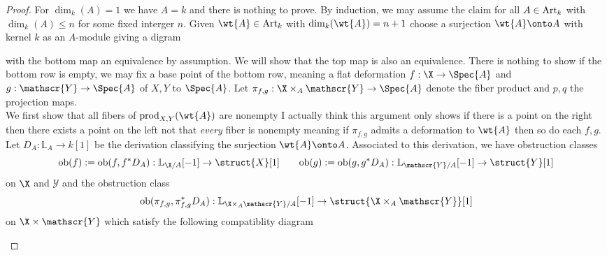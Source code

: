 \documentclass[12pt]{article}
\newcommand{\LL}{\mathbb{L}}
\newcommand{\ob}{\mathrm{ob}}
\newcommand{\Y}{\mathscr{Y}}
\begin{document}
\begin{proof}
For $\dim_k(A) = 1$ we have $A = k$ and there is nothing to prove. By induction, we may assume the claim for all $A \in \mathrm{Art}_k$ with $\dim_k(A) \le n$ for some fixed interger $n$. Given $\wt{A} \in \Art_k$ with $\dim_k(\wt{A}) = n + 1$ choose a surjection $\wt{A} \onto A$ with kernel $k$ as an $A$-module giving a digram
\begin{center}
\end{center}
with the bottom map an equivalence by assumption. We will show that the top map is also an equivalence. There is nothing to show if the bottom row is empty, we may fix a base point of the bottom row, meaning a flat deformation $f : \X \to \Spec{A}$ and $g : \Y \to \Spec{A}$ of $X, Y$ to $\Spec{A}$. Let $\pi_{f,g} : \X \times_A \Y \to \Spec{A}$ denote the fiber product and $p, q$ the projection maps.
\bigskip\\
We first show that all fibers of $\mathrm{prod}_{X,Y}(\wt{A})$ are nonempty {\color{red} I actually think this argument only shows if there is a point on the right then there exists a point on the left not that \textit{every} fiber is nonempty} meaning if $\pi_{f,g}$ admits a deformation to $\wt{A}$ then so do each $f, g$. Let $D_A : \LL_A \to k[1]$ be the derivation classifying the surjection $\wt{A} \onto A$. Associated to this derivation, we have obstruction classes
\[ \ob(f) := \ob(f, f^* D_A) : \LL_{\X/A}[-1] \to \struct{X}[1] \quad \quad \ob(g) := \ob(g, g^* D_A) : \LL_{\Y/A}[-1] \to \struct{Y}[1] \]
on $\X$ and $\Y$ and the obstruction class
\[ \ob(\pi_{f,g}, \pi_{f,g}^* D_A) : \LL_{\X \times_A \Y/A} [-1] \to \struct{\X \times_A \Y}[1] \]
on $\X \times \Y$ which satisfy the following compatiblity diagram
\begin{center}

\end{center}
\end{proof}
\end{document}
